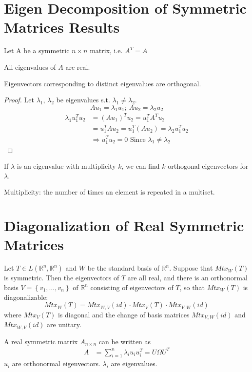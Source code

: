 \documentclass[11pt]{elegantbook}
\begin{document}
\section{Eigen Decomposition of Symmetric Matrices Results}
Let A be a symmetric $n\times n$ matrix, i.e. $A^T=A$
\begin{proposition}
All eigenvalues of $A$ are real.
\end{proposition}
\begin{proposition}
Eigenvectors corresponding to distinct eigenvalues are orthogonal.
\end{proposition}
\begin{proof}
\quad

Let $\lambda_1$, $\lambda_2$ be eigenvalues s.t. $\lambda_1\neq\lambda_2$.
$$Au_1=\lambda_1 u_1;\ Au_2=\lambda_2 u_2$$
\begin{equation}
    \begin{aligned}
        \lambda_1 u_1^Tu_2&=(Au_1)^Tu_2=u^T_1A^Tu_2\\
        &=u^T_1Au_2=u^T_1(Au_2)=\lambda_2 u^T_1u_2\\
        &\Rightarrow	u_1^Tu_2=0\text{ Since }\lambda_1\neq\lambda_2
    \end{aligned}
    \nonumber
\end{equation}
\end{proof}

\begin{proposition}
If $\lambda$ is an eigenvalue with multiplicity $k$, we can find $k$ orthogonal eigenvectors for $\lambda$.
\end{proposition}
Multiplicity: the number of times an element is repeated in a multiset.

\section{Diagonalization of Real Symmetric Matrices}
\begin{theorem}
    Let $T \in L\left(\mathbb{R}^n, \mathbb{R}^n\right)$ and $W$ be the standard basis of $\mathbb{R}^n$. Suppose that $M t x_W(T)$ is symmetric. Then the eigenvectors of $T$ are all real, and there is an orthonormal basis $V=\left\{v_1, \ldots, v_n\right\}$ of $\mathbb{R}^n$ consisting of eigenvectors of $T$, so that $M t x_W(T)$ is diagonalizable:
    $$
    M t x_W(T)=M t x_{W, V}(i d) \cdot M t x_V(T) \cdot M t x_{V, W}(i d)
    $$
    where $M t x_V (T)$ is diagonal and the change of basis matrices $M t x_{V, W}(i d)$ and $M t x_{W, V}(i d)$ are unitary.
\end{theorem}
A real symmetric matrix $A_{n\times n}$ can be written as
\begin{equation}
    \begin{aligned}
        A&=\sum_{i=1}^n\lambda_i u_iu_i^T=U\Omega U^T
    \end{aligned}
    \nonumber
\end{equation}
$u_i$ are orthonormal eigenvectors. $\lambda_i$ are eigenvalues.
\end{document}
